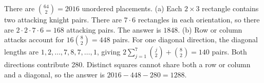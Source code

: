 There are $\binom{64}{2}=2016$ unordered placements. (a) Each $2\times3$ rectangle contains two attacking knight pairs. There are $7\cdot6$ rectangles in each orientation, so there are $2\cdot2\cdot7\cdot6=168$ attacking pairs. The answer is $\boxed{1848}$. (b) Row or column attacks account for $16\binom{8}{2}=448$ pairs. For one diagonal direction, the diagonal lengths are $1,2,\ldots,7,8,7,\ldots,1$, giving $2\sum_{j=1}^7\binom j2+\binom82=140$ pairs. Both directions contribute 280. Distinct squares cannot share both a row or column and a diagonal, so the answer is $2016-448-280=\boxed{1288}$.

